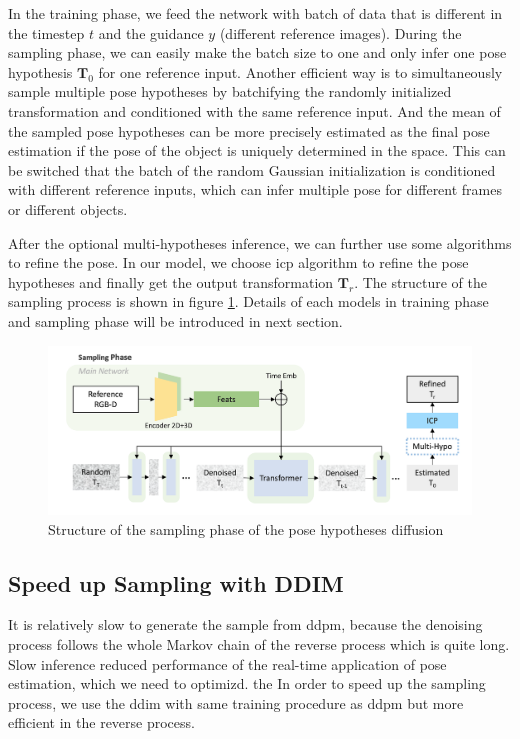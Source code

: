 \documentclass[12pt,DIV14,BCOR12mm,a4paper,footinclude=false,headinclude,parskip=half-,twoside,openright,cleardoublepage=empty,toc=index,bibliography=totoc,listof=totoc]{scrreprt}
\numberwithin{equation}{chapter}
\begin{document}
In the training phase, we feed the network with batch of data that is different in the timestep $t$ and the guidance $y$ (different reference images). During the sampling phase, we can easily make the batch size to one and only infer one pose hypothesis $\mathbf{T}_{0}$ for one reference input. Another efficient way is to simultaneously sample multiple pose hypotheses by batchifying the randomly initialized transformation and conditioned with the same reference input. And the mean of the sampled pose hypotheses can be more precisely estimated as the final pose estimation if the pose of the object is uniquely determined in the space. This can be switched that the batch of the random Gaussian initialization is conditioned with different reference inputs, which can infer multiple pose for different frames or different objects.

After the optional multi-hypotheses inference, we can further use some algorithms to refine the pose. In our model, we choose \gls{icp}\cite{121791} algorithm to refine the pose hypotheses and finally get the output transformation $\mathbf{T}_{r}$. The structure of the sampling process is shown in figure \ref{img:sample}. Details of each models in training phase and sampling phase will be introduced in next section.
\begin{figure}[h]
	\centering
	\includegraphics[scale=.235]{img/sample.png}
	\caption{Structure of the sampling phase of the pose hypotheses diffusion}
	\label{img:sample}
\end{figure}

\subsection{Speed up Sampling with DDIM}
It is relatively slow to generate the sample from \gls{ddpm}, because the denoising process follows the whole Markov chain of the reverse process which is quite long. Slow inference reduced performance of the real-time application of pose estimation, which we need to optimizd. the In order to speed up the sampling process, we use the \gls{ddim} \cite{song2022denoising} with same training procedure as \gls{ddpm} but more efficient in the reverse process.
\end{document}

